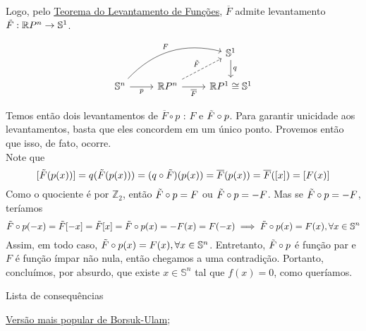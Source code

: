 \begin{dem}
    Logo, pelo \hyperref[levantamento-de-funções-prop]{Teorema do Levantamento de Funções}, $\overline{F}$ admite levantamento $\Tilde{F}: \mathbb{R}P^n \rightarrow \mathbb{S}^1$.

    \[\begin{tikzcd}
                                                         &                                                                          & \mathbb{S}^1 \arrow[d, "q"]      \\
    \mathbb{S}^n \arrow[r, "p"'] \arrow[rru, "F", bend left] & \mathbb{R}P^n \arrow[r, "\overline{F}"'] \arrow[ru, "\Tilde{F}", dashed] & \mathbb{R}P^1 \cong \mathbb{S}^1
    \end{tikzcd}\]

    Temos então dois levantamentos de $\overline{F} \circ p$ : $F$ e $\Tilde{F} \circ p$. Para garantir unicidade aos levantamentos, basta que eles concordem em um único ponto. Provemos então que isso, de fato, ocorre. \\
    Note que 
    $$
    [\Tilde{F}(p(x))] = q(\Tilde{F}(p(x))) = (q \circ \Tilde{F})(p(x)) = \overline{F}(p(x)) = \overline{F}([x]) = [F(x)]
    $$
    Como o quociente é por $\mathbb{Z}_2$, então $\Tilde{F} \circ p = F$ ou $\Tilde{F} \circ p = -F$. Mas se $\Tilde{F} \circ p = -F$, teríamos
    $$
    \Tilde{F} \circ p(-x) = \Tilde{F}[-x] = \Tilde{F}[x] = \Tilde{F} \circ p(x) = -F(x) = F(-x) \implies \Tilde{F} \circ p(x) = F(x), \forall x \in \mathbb{S}^n
    $$
    Assim, em todo caso, $\Tilde{F} \circ p(x) = F(x), \forall x \in \mathbb{S}^n$. Entretanto, $\Tilde{F} \circ p$ é função par e $F$ é função ímpar não nula, então chegamos a uma contradição. Portanto, concluímos, por absurdo, que existe $x \in \mathbb{S}^n$ tal que $f(x) = 0$, como queríamos. 

\end{dem}

\begin{titlemize}{Lista de consequências}
	\item \hyperref[teo-borsuk-ulam-corol-prop]{Versão mais popular de Borsuk-Ulam};\\ %
\end{titlemize}

